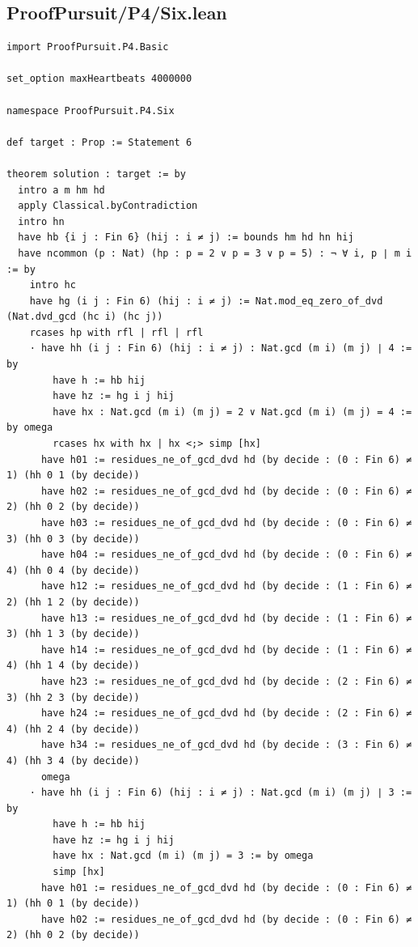 \documentclass[11pt,a4paper]{article}
\begin{document}
\subsection{ProofPursuit/P4/Six.lean}\label{proofpursuitp4six.lean}

\begin{Verbatim}[breaklines,breakanywhere,fontsize=\footnotesize]
import ProofPursuit.P4.Basic

set_option maxHeartbeats 4000000

namespace ProofPursuit.P4.Six

def target : Prop := Statement 6

theorem solution : target := by
  intro a m hm hd
  apply Classical.byContradiction
  intro hn
  have hb {i j : Fin 6} (hij : i ≠ j) := bounds hm hd hn hij
  have ncommon (p : Nat) (hp : p = 2 ∨ p = 3 ∨ p = 5) : ¬ ∀ i, p ∣ m i := by
    intro hc
    have hg (i j : Fin 6) (hij : i ≠ j) := Nat.mod_eq_zero_of_dvd (Nat.dvd_gcd (hc i) (hc j))
    rcases hp with rfl | rfl | rfl
    · have hh (i j : Fin 6) (hij : i ≠ j) : Nat.gcd (m i) (m j) ∣ 4 := by
        have h := hb hij
        have hz := hg i j hij
        have hx : Nat.gcd (m i) (m j) = 2 ∨ Nat.gcd (m i) (m j) = 4 := by omega
        rcases hx with hx | hx <;> simp [hx]
      have h01 := residues_ne_of_gcd_dvd hd (by decide : (0 : Fin 6) ≠ 1) (hh 0 1 (by decide))
      have h02 := residues_ne_of_gcd_dvd hd (by decide : (0 : Fin 6) ≠ 2) (hh 0 2 (by decide))
      have h03 := residues_ne_of_gcd_dvd hd (by decide : (0 : Fin 6) ≠ 3) (hh 0 3 (by decide))
      have h04 := residues_ne_of_gcd_dvd hd (by decide : (0 : Fin 6) ≠ 4) (hh 0 4 (by decide))
      have h12 := residues_ne_of_gcd_dvd hd (by decide : (1 : Fin 6) ≠ 2) (hh 1 2 (by decide))
      have h13 := residues_ne_of_gcd_dvd hd (by decide : (1 : Fin 6) ≠ 3) (hh 1 3 (by decide))
      have h14 := residues_ne_of_gcd_dvd hd (by decide : (1 : Fin 6) ≠ 4) (hh 1 4 (by decide))
      have h23 := residues_ne_of_gcd_dvd hd (by decide : (2 : Fin 6) ≠ 3) (hh 2 3 (by decide))
      have h24 := residues_ne_of_gcd_dvd hd (by decide : (2 : Fin 6) ≠ 4) (hh 2 4 (by decide))
      have h34 := residues_ne_of_gcd_dvd hd (by decide : (3 : Fin 6) ≠ 4) (hh 3 4 (by decide))
      omega
    · have hh (i j : Fin 6) (hij : i ≠ j) : Nat.gcd (m i) (m j) ∣ 3 := by
        have h := hb hij
        have hz := hg i j hij
        have hx : Nat.gcd (m i) (m j) = 3 := by omega
        simp [hx]
      have h01 := residues_ne_of_gcd_dvd hd (by decide : (0 : Fin 6) ≠ 1) (hh 0 1 (by decide))
      have h02 := residues_ne_of_gcd_dvd hd (by decide : (0 : Fin 6) ≠ 2) (hh 0 2 (by decide))

\end{Verbatim}
\end{document}
